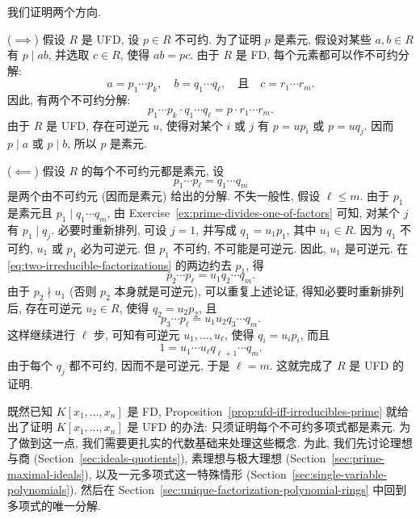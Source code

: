 \begin{Proof}
  我们证明两个方向.

  ($\implies$) 假设 $R$ 是 UFD, 设 $p\in R$ 不可约. 为了证明 $p$ 是素元, 假设对某些 $a,b\in R$ 有 $p\mid ab$, 并选取 $c\in R$, 使得 $ab=pc$. 由于 $R$ 是 FD, 每个元素都可以作不可约分解:
  \[
    a=p_{1}\cdots p_{k},\quad b=q_{1}\cdots q_{\ell},\quad\text{且}\quad c=r_{1}\cdots r_{m}.
  \]
  因此, 有两个不可约分解:
  \[
    p_{1}\cdots p_{k}\cdot q_{1}\cdots q_{\ell}=p\cdot r_{1}\cdots r_{m}.
  \]
  由于 $R$ 是 UFD, 存在可逆元 $u$, 使得对某个 $i$ 或 $j$ 有 $p=up_{i}$ 或 $p=uq_{j}$. 因而 $p\mid a$ 或 $p\mid b$, 所以 $p$ 是素元.

  ($\impliedby$) 假设 $R$ 的每个不可约元都是素元, 设
  \begin{equation}\label{eq:two-irreducible-factorizations}
    p_{1}\cdots p_{\ell}=q_{1}\cdots q_{m}
  \end{equation}
  是两个由不可约元 (因而是素元) 给出的分解. 不失一般性, 假设 $\ell\leq m$. 由于 $p_{1}$ 是素元且 $p_{1}\mid q_{1}\cdots q_{m}$, 由 Exercise~\ref{ex:prime-divides-one-of-factors} 可知, 对某个 $j$ 有 $p_{1}\mid q_{j}$. 必要时重新排列, 可设 $j=1$, 并写成 $q_{1}=u_{1}p_{1}$, 其中 $u_{1}\in R$. 因为 $q_{1}$ 不可约, $u_{1}$ 或 $p_{1}$ 必为可逆元. 但 $p_{1}$ 不可约, 不可能是可逆元. 因此, $u_{1}$ 是可逆元. 在 \eqref{eq:two-irreducible-factorizations} 的两边约去 $p_{1}$, 得
  \[
    p_{2}\cdots p_{\ell}=u_{1}q_{2}\cdots q_{m}.
  \]
  由于 $p_{2}\nmid u_{1}$ (否则 $p_{2}$ 本身就是可逆元), 可以重复上述论证, 得知必要时重新排列后, 存在可逆元 $u_{2}\in R$, 使得 $q_{2}=u_{2}p_{2}$, 且
  \[
    p_{3}\cdots p_{\ell}=u_{1}u_{2}q_{3}\cdots q_{m}.
  \]
  这样继续进行 $\ell$ 步, 可知有可逆元 $u_{1},\ldots,u_{\ell}$, 使得 $q_{i}=u_{i}p_{i}$, 而且
  \[
    1=u_{1}\cdots u_{\ell}q_{\ell+1}\cdots q_{m}.
  \]
  由于每个 $q_{j}$ 都不可约, 因而不是可逆元, 于是 $\ell=m$. 这就完成了 $R$ 是 UFD 的证明.
\end{Proof}

既然已知 $K[x_{1},\ldots,x_{n}]$ 是 FD, Proposition~\ref{prop:ufd-iff-irreducibles-prime} 就给出了证明 $K[x_{1},\ldots,x_{n}]$ 是 UFD 的办法: 只须证明每个不可约多项式都是素元. 为了做到这一点, 我们需要更扎实的代数基础来处理这些概念. 为此, 我们先讨论理想与商 (Section~{\ref{sec:ideals-quotients}}), 素理想与极大理想 (Section~{\ref{sec:prime-maximal-ideals}}), 以及一元多项式这一特殊情形 (Section~{\ref{sec:single-variable-polynomials}}). 然后在 Section~{\ref{sec:unique-factorization-polynomial-rings}} 中回到多项式的唯一分解.

